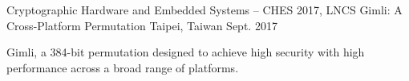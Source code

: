 \begin{cventries}
  \cventry
    {Cryptographic Hardware and Embedded Systems – CHES 2017, LNCS}
    {Gimli: A Cross-Platform Permutation} %
    {Taipei, Taiwan} %
    {Sept. 2017} %
    {
      \begin{cvitems} %
        \item {Gimli, a 384-bit permutation designed to achieve high security with high performance across a broad range of platforms.}
      \end{cvitems}
    }


\end{cventries}
